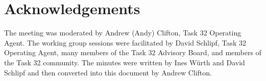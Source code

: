 \section{Acknowledgements}
The meeting was moderated by Andrew (Andy) Clifton, Task 32 Operating Agent. The working group sessions were facilitated by David Schlipf, Task 32 Operating Agent, many members of the Task 32 Advisory Board, and members of the Task 32 community. The minutes were written by Ines Würth and David Schlipf and then converted into this document by Andrew Clifton.
